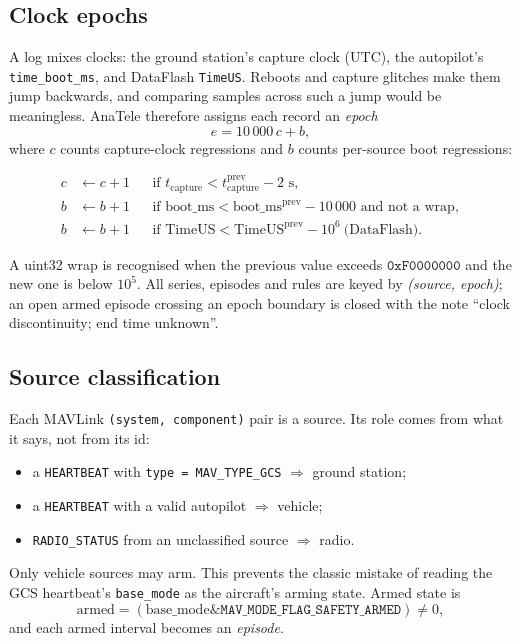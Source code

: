 \documentclass[11pt,a4paper]{article}
\newcommand{\code}[1]{\texttt{#1}}
\begin{document}
\subsection{Clock epochs}
A log mixes clocks: the ground station's capture clock (UTC), the autopilot's
\code{time\_boot\_ms}, and DataFlash \code{TimeUS}. Reboots and capture glitches make them jump
backwards, and comparing samples across such a jump would be meaningless. AnaTele therefore assigns
each record an \emph{epoch}
\[
e = 10\,000\,c + b,
\]
where $c$ counts capture-clock regressions and $b$ counts per-source boot regressions:

\begin{align*}
c &\leftarrow c+1 && \text{if } t_{\text{capture}} < t_{\text{capture}}^{\text{prev}} - 2\text{ s},\\
b &\leftarrow b+1 && \text{if } \text{boot\_ms} < \text{boot\_ms}^{\text{prev}} - 10\,000
                    \text{ and not a wrap},\\
b &\leftarrow b+1 && \text{if } \text{TimeUS} < \text{TimeUS}^{\text{prev}} - 10^{6}\ \text{(DataFlash)}.
\end{align*}

A uint32 wrap is recognised when the previous value exceeds $\mathtt{0xF0000000}$ and the new one is
below $10^5$. All series, episodes and rules are keyed by \emph{(source, epoch)}; an open armed
episode crossing an epoch boundary is closed with the note ``clock discontinuity; end time unknown''.

\subsection{Source classification}
Each MAVLink \code{(system, component)} pair is a source. Its role comes from what it says, not
from its id:
\begin{itemize}
  \item a \code{HEARTBEAT} with \code{type = MAV\_TYPE\_GCS} $\Rightarrow$ ground station;
  \item a \code{HEARTBEAT} with a valid autopilot $\Rightarrow$ vehicle;
  \item \code{RADIO\_STATUS} from an unclassified source $\Rightarrow$ radio.
\end{itemize}
Only vehicle sources may arm. This prevents the classic mistake of reading the GCS heartbeat's
\code{base\_mode} as the aircraft's arming state. Armed state is
\[
\text{armed} = (\text{base\_mode} \mathbin{\&} \mathtt{MAV\_MODE\_FLAG\_SAFETY\_ARMED}) \ne 0,
\]
and each armed interval becomes an \emph{episode}.
\end{document}

